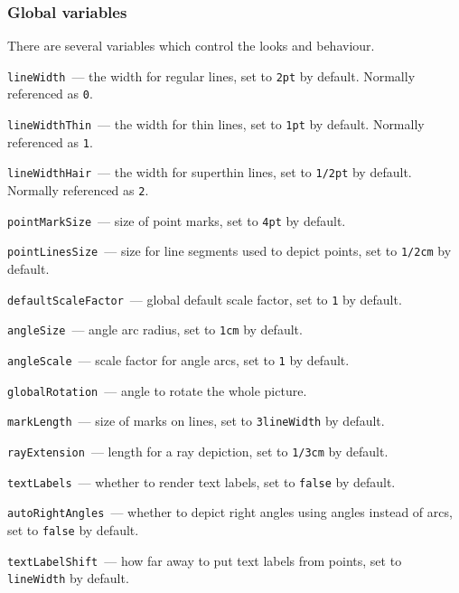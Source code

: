 \subsubsection{Global variables}\label{Variables}
	
	There are several variables which control the looks and behaviour.
	
	\texttt{lineWidth}\label{lineWidth}~— the width for regular lines, set to \texttt{2pt} by default. Normally referenced as \texttt{0}.
	
	\texttt{lineWidthThin}~— the width for thin lines, set to \texttt{1pt} by default. Normally referenced as \texttt{1}.
	
	\texttt{lineWidthHair}~— the width for superthin lines, set to \texttt{1/2pt} by default. Normally referenced as \texttt{2}.
	
	\texttt{pointMarkSize}\label{pointMarkSize}~— size of point marks, set to \texttt{4pt} by default.
	
	\texttt{pointLinesSize}\label{pointLinesSize}~— size for line segments used to depict points, set to \texttt{1/2cm} by default.

	\texttt{defaultScaleFactor}~— global default scale factor, set to \texttt{1} by default.

	\texttt{angleSize}\label{angleSize}~— angle arc radius, set to \texttt{1cm} by default.
	
	\texttt{angleScale}\label{angleScale}~— scale factor for angle arcs, set to \texttt{1} by default.

	\texttt{globalRotation}~— angle to rotate the whole picture.

	\texttt{markLength}~— size of marks on lines, set to \texttt{3lineWidth} by default.

	\texttt{rayExtension}~— length for a ray depiction, set to \texttt{1/3cm} by default.

	
	\texttt{textLabels}~— whether to render text labels, set to \texttt{false} by default.


	\texttt{autoRightAngles}\label{autoRightAngles}~— whether to depict right angles using angles instead of arcs, set to \texttt{false} by default.

	
	\texttt{textLabelShift}~— how far away to put text labels from points, set to \texttt{lineWidth} by default.
	
